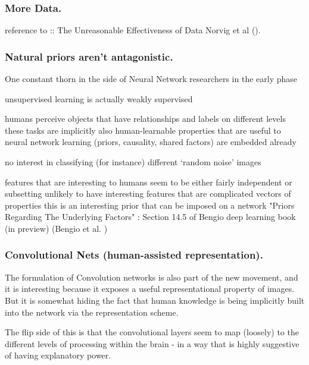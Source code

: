 \documentclass[citeauthoryear]{llncs}
\begin{document}
\subsubsection*{More Data.}

  reference to :: The Unreasonable Effectiveness of Data  Norvig et al (\cite{norvig-UnreasonableEffectivenessOfData}).


\subsubsection*{Natural priors aren't antagonistic.}

One constant thorn in the side of Neural Network researchers in the early phase



unsupervised learning is actually weakly supervised 

  humans perceive objects that have relationships and labels on different levels
    these tasks are implicitly also human-learnable
    properties that are useful to neural network learning (priors, causality, shared factors) are embedded already
    
  no interest in classifying (for instance) different `random noise' images
  
  features that are interesting to humans seem to be either fairly independent or subsetting
    unlikely to have interesting features that are complicated vectors of properties
    this is an interesting prior that can be imposed on a network
      "Priors Regarding The Underlying Factors" : Section 14.5 of Bengio deep learning book (in preview) 
        (Bengio et al. \cite{Bengio-et-al-2014-Book}) 

\subsubsection*{Convolutional Nets (human-assisted representation).}

The formulation of Convolution networks is also part of the new movement, 
and it is interesting because it exposes a useful representational property of images.  
But it is somewhat hiding the fact that human knowledge is being implicitly 
built into the network via the representation scheme.

The flip side of this is that the convolutional layers seem to 
map (loosely) to the different levels of processing within the brain - 
in a way that is highly suggestive of having explanatory power.
\end{document}
